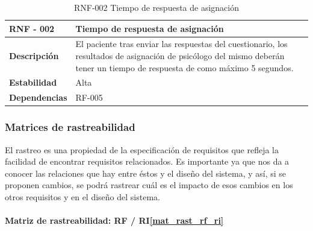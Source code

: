 \begin{table}[htpb]
\centering
\begin{tabularx}{\textwidth}{|l|X|}
\hline
\rowcolor[gray]{0.9}\textbf{RNF - 002}                               & \textbf{Tiempo de respuesta de asignación}                                                                                                                                            \\ \hline
\textbf{Descripción}                             & El paciente tras enviar las respuestas del cuestionario, los resultados de asignación de psicólogo del mismo deberán tener un tiempo de respuesta de como máximo 5 segundos. \\ \hline
\textbf{Estabilidad}                             & Alta                                                                                                                                                                         \\ \hline
\textbf{Dependencias} & RF-005                                                                                                                                                                       \\ \hline
\end{tabularx}
\caption{RNF-002 Tiempo de respuesta de asignación}                                                                                                                                                                                                                                                                      
\end{table}


\subsubsection{Matrices de rastreabilidad}

El rastreo es una propiedad de la especificación de requisitos que refleja la facilidad de encontrar requisitos relacionados. Es importante ya que nos da a conocer las relaciones que hay entre éstos y el diseño del sistema, y así, si se proponen cambios, se podrá rastrear cuál es el impacto de esos cambios en los otros requisitos y en el diseño del sistema.


\paragraph{Matriz de rastreabilidad: RF / RI\ref{mat_rast_rf_ri}}

